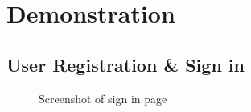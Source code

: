 \chapter{Demonstration} 
\label{chapter:introduction}

\section{User Registration \& Sign in}
\begin{figure}[htb]
    \centering
    \caption{{\footnotesize Screenshot of sign in page}}
    \label{fig:signin}
\end{figure}

